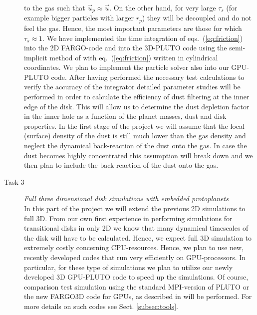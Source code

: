 \documentclass[10pt,fleqn,twoside]{article}
\begin{document}
\begin{description}
to the gas such that $\vec{u}_p \approx \vec{u}$. On the other hand, for very large $\tau_s$ (for example bigger particles with larger $r_p$)
they will be decoupled and do not feel the gas.  Hence, the most important parameters are those for which $\tau_s \approx 1$.
We have implemented the time integration of eqs.~(\ref{eq:friction}) into the 2D FARGO-code \citep{2015A&A...584A.110P}
and into the 3D-PLUTO code \citep{2016A&A...594A..57S} using the semi-implicit method of \citet{Bai2010ApJS..190..297B}
with eq.~(\ref{eq:friction}) written in cylindrical coordinates.
We plan to implement the particle solver also into our GPU-PLUTO code.
After having performed the necessary test calculations to verify the accuracy of the integrator
detailed parameter studies will be performed in order to calculate the efficiency of dust filtering
at the inner edge of the disk. This will allow us to determine the dust depletion factor in the inner
hole as a function of the planet masses, dust and disk properties. In the first stage of the project we will assume that
the local (surface) density of the dust is still much lower than the gas density and neglect the dynamical back-reaction of the dust onto
the gas. In case the dust becomes highly concentrated this assumption will break down and we then 
plan to include the back-reaction of the dust onto the gas.


\item[Task 3]
{\it Full three dimensional disk simulations with embedded protoplanets}\\
%
In this part of the project we will extend the previous 2D simulations to full 3D.
From our own first experience in performing simulations for transitional disks
\citep{2013A&A...560A..40M} in only 2D we know that many dynamical timescales of the disk
will have to be calculated. Hence, we expect full 3D simulation to extremely costly concerning
CPU-resources. Hence, we plan to use new, recently developed codes that run very efficiently on GPU-processors.
In particular, for these type of simulations we plan to utilize our newly developed 3D GPU-PLUTO code 
\citep{2016A&A...589A..10T} to speed up the simulations. Of course, comparison test simulation using the
standard MPI-version of PLUTO or the new FARGO3D code for GPUs, as described in \citet{2016ApJS..223...11B}
will be performed.
For more details on such codes see Sect. \ref{subsec:tools}.


\end{description}
\end{document}
